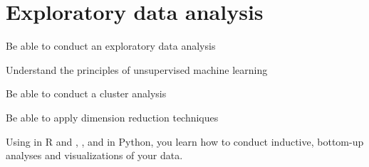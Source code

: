 \chapter{Exploratory data analysis}
\label{chap:eda}

\begin{abstract}{Abstract} This chapter explains how to use data analysis and visualization techniques to understand and communicate the structure and story of our data.  It first introduces the reader to exploratory statistics and data visualization in R and Python. Then, it discusses how unsupervised machine learning, in particular clustering and dimensionality reduction techniques, can be used to group similar cases or to decrease the number of features in a dataset.
\end{abstract}



\begin{objectives}
\item Be able to conduct an exploratory data analysis
\item Understand the principles of unsupervised machine learning
\item Be able to conduct a cluster analysis
\item Be able to apply dimension reduction techniques
\end{objectives}

\begin{feature}
Using  in R and , ,  and  in Python, you learn how to conduct inductive, bottom-up analyses and visualizations of your data.
\end{feature}








